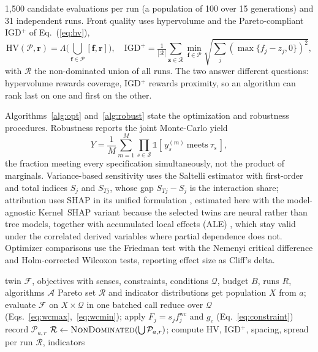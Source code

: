\documentclass[11pt,a4paper]{article}
\begin{document}
1{,}500 candidate evaluations per run (a population of 100 over 15 generations) and
31 independent runs. Front
quality uses hypervolume and the Pareto-compliant IGD$^{+}$ of
Eq.~(\ref{eq:hv}),
\begin{equation}
\mathrm{HV}(\mathcal{P},\mathbf{r}) =
\Lambda\!\Big(\bigcup_{\mathbf{f}\in\mathcal{P}}[\mathbf{f},\mathbf{r}]\Big),
\quad
\mathrm{IGD}^{+} =
\tfrac{1}{|\mathcal{R}|}\textstyle\sum_{\mathbf{z}\in\mathcal{R}}
\min_{\mathbf{f}\in\mathcal{P}}\sqrt{\textstyle\sum_j (\max\{f_j-z_j,0\})^2},
\label{eq:hv}
\end{equation}
with $\mathcal{R}$ the non-dominated union of all runs. The two answer different
questions: hypervolume rewards coverage, IGD$^{+}$ rewards proximity, so an
algorithm can rank last on one and first on the other.

Algorithms~\ref{alg:opt} and~\ref{alg:robust} state the optimization and
robustness procedures. Robustness reports the joint Monte-Carlo yield
\begin{equation}
Y = \frac{1}{M}\sum_{m=1}^{M}
\prod_{s\in\mathcal{S}}\mathbb{1}[\,y_s^{(m)}\ \text{meets}\ \tau_s\,],
\label{eq:yield}
\end{equation}
the fraction meeting every specification simultaneously, not the product of
marginals. Variance-based sensitivity uses the Saltelli estimator
\cite{saltelli2010sobol} with first-order and total indices $S_j$ and $S_{Tj}$,
whose gap $S_{Tj}-S_j$ is the interaction share; attribution uses SHAP in its
unified formulation \cite{lundberg2017shap}, estimated here with the model-agnostic
Kernel~SHAP variant because the selected twins are neural rather than tree models,
together with accumulated local effects (ALE) \cite{apley2020ale}, which stay valid
under the correlated derived variables where partial dependence does not. Optimizer
comparisons use the Friedman test with the Nemenyi critical difference and
Holm-corrected Wilcoxon tests, reporting effect size as Cliff's delta.

\begin{algorithm}[!ht]
\caption{Robust surrogate-driven multi-objective optimization}
\label{alg:opt}
\begin{algorithmic}[1]
\Require twin $\mathcal{F}$, objectives with senses, constraints, conditions
$\mathcal{Q}$, budget $B$, runs $R$, algorithms $\mathcal{A}$
\Ensure Pareto set $\mathcal{R}$ and indicator distributions
    \State get population $X$ from $a$; evaluate $\mathcal{F}$ on
    $X\times\mathcal{Q}$ in one batched call
    \State reduce over $\mathcal{Q}$ (Eqs.~\ref{eq:wcmax},~\ref{eq:wcmin});
    apply $F_j=s_jf_j^{\mathrm{wc}}$ and $g_c$ (Eq.~\ref{eq:constraint})
  \EndWhile
  \State record $\mathcal{P}_{a,r}$
\EndFor
\State $\mathcal{R} \gets \textsc{NonDominated}(\bigcup \mathcal{P}_{a,r})$;
compute HV, IGD$^{+}$, spacing, spread per run
\State \Return $\mathcal{R}$, indicators
\end{algorithmic}
\end{algorithm}
\end{document}
